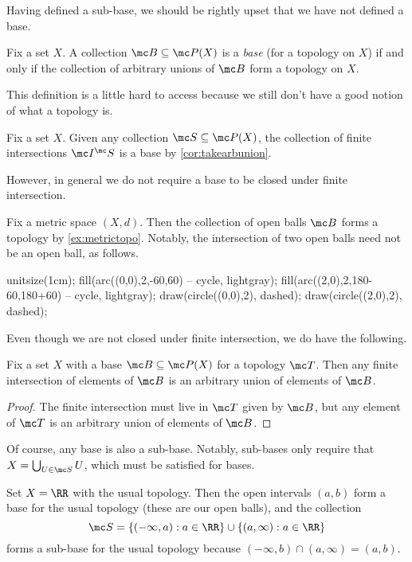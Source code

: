 \documentclass[../notes.tex]{subfiles}
\begin{document}
Having defined a sub-base, we should be rightly upset that we have not defined a base.
\begin{definition}[Base]
	Fix a set $X$. A collection $\mc B\subseteq\mc P(X)$ is a \textit{base} (for a topology on $X$) if and only if the collection of arbitrary unions of $\mc B$ form a topology on $X$.
\end{definition}
This definition is a little hard to access because we still don't have a good notion of what a topology is.
\begin{example}
	Fix a set $X$. Given any collection $\mc S\subseteq\mc P(X)$, the collection of finite intersections $\mc I^\mc S$ is a base by \autoref{cor:takearbunion}.
\end{example}
However, in general we do not require a base to be closed under finite intersection.
\begin{example}
	Fix a metric space $(X,d)$. Then the collection of open balls $\mc B$ forms a topology by \autoref{ex:metrictopo}. Notably, the intersection of two open balls need not be an open ball, as follows.
	\begin{center}
		\begin{asy}
			unitsize(1cm);
			fill(arc((0,0),2,-60,60) -- cycle, lightgray);
			fill(arc((2,0),2,180-60,180+60) -- cycle, lightgray);
			draw(circle((0,0),2), dashed);
			draw(circle((2,0),2), dashed);
		\end{asy}
	\end{center}
\end{example}
Even though we are not closed under finite intersection, we do have the following.
\begin{lemma}
	Fix a set $X$ with a base $\mc B\subseteq\mc P(X)$ for a topology $\mc T$. Then any finite intersection of elements of $\mc B$ is an arbitrary union of elements of $\mc B$.
\end{lemma}
\begin{proof}
	The finite intersection must live in $\mc T$ given by $\mc B$, but any element of $\mc T$ is an arbitrary union of elements of $\mc B$.
\end{proof}
\begin{remark}
	Of course, any base is also a sub-base. Notably, sub-bases only require that $X=\bigcup_{U\in\mc S}U$, which must be satisfied for bases.
\end{remark}
\begin{example}
	Set $X=\RR$ with the usual topology. Then the open intervals $(a,b)$ form a base for the usual topology (these are our open balls), and the collection
	\[\mc S=\{(-\infty,a):a\in\RR\}\cup\{(a,\infty):a\in\RR\}\]
	forms a sub-base for the usual topology because $(-\infty,b)\cap(a,\infty)=(a,b)$.
\end{example}
\end{document}
